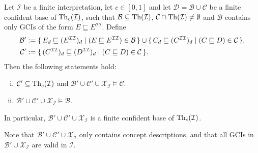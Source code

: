 \begin{Theorem}
  \label{thm:unravelling-confident-bases}
  Let $\mathcal{I}$ be a finite interpretation, let $c \in [0,1]$ and let $\mathcal{D} =
  \mathcal{B} \cup \mathcal{C}$ be a finite confident base of $\operatorname{Th}_c(\mathcal{I})$, such
  that $\mathcal{B} \subseteq \operatorname{Th}(\mathcal{I})$, $\mathcal{C} \cap \operatorname{Th}(\mathcal{I}) \neq
  \emptyset$ and $\mathcal{B}$ contains only GCIs of the form $E \sqsubseteq
  E^{\mathcal{I}\mathcal{I}}$. Define
  \begin{align*}
    \mathcal{B}' &:= {\{\, E_d \sqsubseteq (E^{\mathcal{I}\mathcal{I}})_d \mid (E
      \sqsubseteq E^{\mathcal{I}\mathcal{I}}) \in \mathcal{B} \,\}} \cup {\ensuremath{\{\, C_d \sqsubseteq
      (C^{\mathcal{I}\mathcal{I}})_d \mid (C \sqsubseteq D) \in \mathcal{C} \,\}}},\\
    \mathcal{C}' &:= {\{\, (C^{\mathcal{I}\mathcal{I}})_d \sqsubseteq
      (D^{\mathcal{I}\mathcal{I}})_d \mid (C \sqsubseteq D) \in \mathcal{C} \,\}}.
  \end{align*}
  Then the following statements hold:
  \begin{enumerate}[i. ]
  \item $\mathcal{C}' \subseteq \operatorname{Th}_c(\mathcal{I})$ and $\mathcal{B}' \cup \mathcal{C}'
    \cup \mathcal{X}_{\mathcal{I}} \models \mathcal{C}$.
  \item $\mathcal{B}' \cup \mathcal{C}' \cup \mathcal{X}_{\mathcal{I}} \models
    \mathcal{B}$.
  \end{enumerate}
  In particular, $\mathcal{B}' \cup \mathcal{C}' \cup \mathcal{X}_{\mathcal{I}}$ is a
  finite confident \ELbot base of $\operatorname{Th}_c(\mathcal{I})$.
\end{Theorem}

Note that $\mathcal{B}' \cup \mathcal{C}' \cup \mathcal{X}_{\mathcal{I}}$ only contains
\ELbot concept descriptions, and that all GCIs in $\mathcal{B}' \cup
\mathcal{X}_{\mathcal{I}}$ are valid in $\mathcal{I}$.

